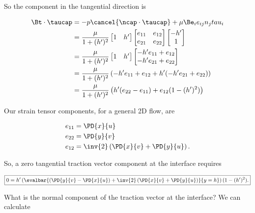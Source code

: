 So the component in the tangential direction is

\begin{align*}
\Bt \cdot \taucap 
&=
-p \cancel{\ncap \cdot \taucap} + \mu \Be_i e_{ij} n_j tau_i \\
&=
\frac{\mu}{1 + (h')^2}
\begin{bmatrix}
1 & h' 
\end{bmatrix}
\begin{bmatrix}
e_{11} & e_{12} \\
e_{21} & e_{22}
\end{bmatrix}
\begin{bmatrix}
-h'  \\
1
\end{bmatrix} \\
&=
\frac{\mu}{1 + (h')^2}
\begin{bmatrix}
1 & h' 
\end{bmatrix}
\begin{bmatrix}
-h' e_{11} + e_{12} \\
-h' e_{21} + e_{22}
\end{bmatrix} \\
&=
\frac{\mu}{1 + (h')^2}
\left(
-h' e_{11} + e_{12} + h'( -h' e_{21} + e_{22} )
\right) \\
&=
\frac{\mu}{1 + (h')^2}
\left(
h' (e_{22} - e_{11} )
+ e_{12} (1 - (h')^2 )
\right) 
\end{align*}

Our strain tensor components, for a general 2D flow, are

\begin{align}\label{eqn:inclinedFlowWithoutConstantHeightAssumption:200}
e_{11} &= \PD{x}{u} \\
e_{22} &= \PD{y}{v} \\
e_{12} &= 
\inv{2} \left( 
\PD{x}{v} +
\PD{y}{u}
\right).
\end{align}

So, a zero tangential traction vector component at the interface requires

\begin{equation}\label{eqn:inclinedFlowWithoutConstantHeightAssumption:220}
\boxed{
0 = h' \left( \evalbar{\left( \PD{y}{v} - \PD{x}{u} \right) + 
\inv{2} \left( 
\PD{x}{v} +
\PD{y}{u}
\right)
}{y = h}\right)
(1 - (h')^2 ).
}
\end{equation}

What is the normal component of the traction vector at the interface?  We can calculate

